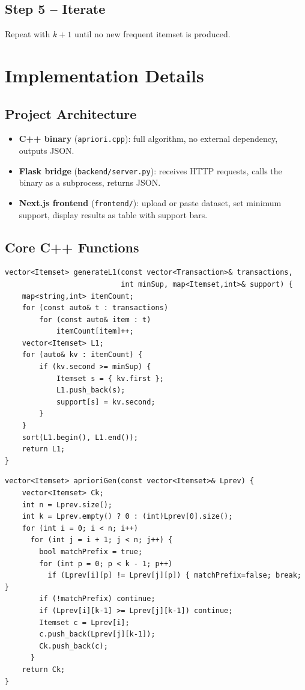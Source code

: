 \documentclass[11pt,a4paper]{article}
\begin{document}
\subsection{Step 5 -- Iterate}
Repeat with $k+1$ until no new frequent itemset is produced.

\section{Implementation Details}

\subsection{Project Architecture}
\begin{itemize}[leftmargin=1.4em]
  \item \textbf{C++ binary} (\texttt{apriori.cpp}): full algorithm,
        no external dependency, outputs JSON.
  \item \textbf{Flask bridge} (\texttt{backend/server.py}): receives HTTP
        requests, calls the binary as a subprocess, returns JSON.
  \item \textbf{Next.js frontend} (\texttt{frontend/}): upload or paste
        dataset, set minimum support, display results as table with
        support bars.
\end{itemize}

\subsection{Core C++ Functions}

\begin{lstlisting}[caption={Generate $L_1$ -- frequent 1-itemsets}]
vector<Itemset> generateL1(const vector<Transaction>& transactions,
                           int minSup, map<Itemset,int>& support) {
    map<string,int> itemCount;
    for (const auto& t : transactions)
        for (const auto& item : t)
            itemCount[item]++;
    vector<Itemset> L1;
    for (auto& kv : itemCount) {
        if (kv.second >= minSup) {
            Itemset s = { kv.first };
            L1.push_back(s);
            support[s] = kv.second;
        }
    }
    sort(L1.begin(), L1.end());
    return L1;
}
\end{lstlisting}

\begin{lstlisting}[caption={Candidate generation -- join step}]
vector<Itemset> aprioriGen(const vector<Itemset>& Lprev) {
    vector<Itemset> Ck;
    int n = Lprev.size();
    int k = Lprev.empty() ? 0 : (int)Lprev[0].size();
    for (int i = 0; i < n; i++)
      for (int j = i + 1; j < n; j++) {
        bool matchPrefix = true;
        for (int p = 0; p < k - 1; p++)
          if (Lprev[i][p] != Lprev[j][p]) { matchPrefix=false; break; }
        if (!matchPrefix) continue;
        if (Lprev[i][k-1] >= Lprev[j][k-1]) continue;
        Itemset c = Lprev[i];
        c.push_back(Lprev[j][k-1]);
        Ck.push_back(c);
      }
    return Ck;
}
\end{lstlisting}
\end{document}
